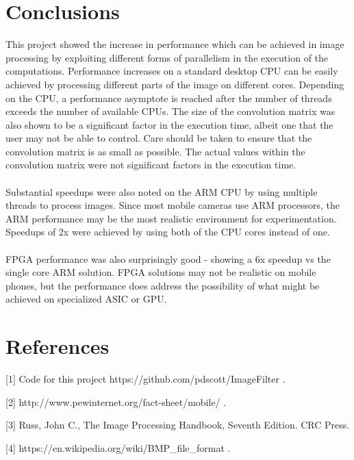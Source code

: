 \documentclass{article} %
\begin{document}
\section{Conclusions}
This project showed the increase in performance which can be achieved in image processing by exploiting different forms of parallelism in the execution of the computations.  Performance increases on a standard desktop CPU can be easily achieved by processing different parts of the image on different cores. Depending on the CPU, a performance asymptote is reached after the number of threads exceeds the number of available CPUs. The size of the convolution matrix was also shown to be a significant factor in the execution time, albeit one that the user may not be able to control. Care should be taken to ensure that the convolution matrix is as small as possible.  The actual values within the convolution matrix were not significant factors in the execution time.  \\
\\
Substantial speedups were also noted on the ARM CPU by using multiple threads to process images. Since most mobile cameras use ARM processors, the ARM performance may be the most realistic environment for experimentation. Speedups of 2x were achieved by using both of the CPU cores instead of one.  \\
\\
FPGA performance was also surprisingly good - showing a 6x speedup vs the single core ARM solution. FPGA solutions may not be realistic on mobile phones, but the performance does address the possibility of what might be achieved on specialized ASIC or GPU.

\section*{References}
\small{
[1] Code for this project https://github.com/pdscott/ImageFilter . 

[2] http://www.pewinternet.org/fact-sheet/mobile/ .

[3] Russ, John C., The Image Processing Handbook, Seventh Edition. CRC Press.

[4] https://en.wikipedia.org/wiki/BMP\_file\_format . 

}
\end{document}
